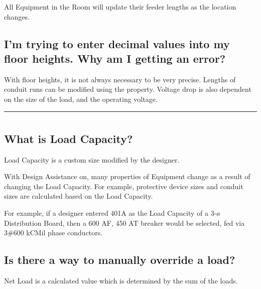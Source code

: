 \documentclass[letterpaper,10pt,english]{sphinxmanual}
\begin{document}
All Equipment in the Room will update their feeder lengths as the location changes.


\subsection{I’m trying to enter decimal values into my floor heights.  Why am I getting an error?}
\label{\detokenize{docs/faq:i-m-trying-to-enter-decimal-values-into-my-floor-heights-why-am-i-getting-an-error}}
With floor heights, it is not always necessary to be very precise.  Lengths of conduit runs can be modified using the {\hyperref[\detokenize{docs/userguide/index-user_guide:manual-added-length}]{}} property.  Voltage drop is also dependent on the size of the load, and the operating voltage.


\bigskip\hrule\bigskip



\section{}
\label{\detokenize{docs/faq:electrical-calculations}}

\subsection{What is Load Capacity?}
\label{\detokenize{docs/faq:what-is-load-capacity}}\label{\detokenize{docs/faq:load-capacity}}
Load Capacity is a custom size modified by the designer.

With Design Assistance on, many properties of Equipment change as a result of changing the Load Capacity.  For example, protective device sizes and conduit sizes are calculated based on the Load Capacity.

For example, if a designer entered 401A as the Load Capacity of a 3-ø Distribution Board, then a 600 AF, 450 AT breaker would be selected, fed via 3\#600 kCMil phase conductors.


\subsection{Is there a way to manually override a load?}
\label{\detokenize{docs/faq:is-there-a-way-to-manually-override-a-load}}\label{\detokenize{docs/faq:load-override}}
Net Load is a calculated value which is determined by the sum of the loads.
\end{document}
